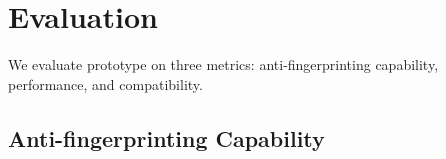 \section{Evaluation} \label{sec:eval}

We evaluate \sys prototype on three metrics: anti-fingerprinting capability, performance, and compatibility. %









\subsection{Anti-fingerprinting Capability} \label{subsec:antifing}


